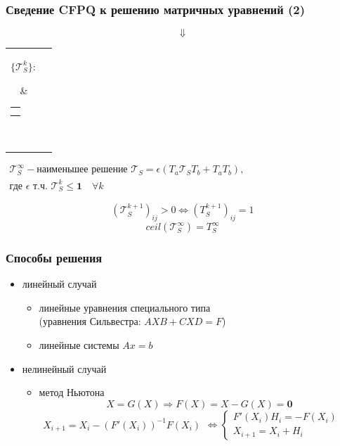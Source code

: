 \documentclass[xcolor=table]{beamer}
\begin{document}
\begin{frame}[fragile]
  \transwipe[direction=90]
  \frametitle{Сведение CFPQ к решению матричных уравнений (2)}
  
    $$\Downarrow$$
    \centering
    \begin{tabular}{cl}
    \parbox{0.07\linewidth}{
    $\{ \mathcal{T}_S^k \}:$
    }
    & \begin{tabular}{l}
    $\mathcal{T}_S^0 = \mathbf{0}$ \\
    $\mathcal{T}_S^{k+1} = \epsilon(T_a \mathcal{T}_S^k T_b + T_a T_b)$
    \end{tabular} \\
    \end{tabular}

    \vspace{20pt}
    \(
    \left.
    \begin{array}{c}
    \mathcal{T}_S^{\infty} - \texttt{наименьшее решение } \mathcal{T}_S = \epsilon(T_a \mathcal{T}_S T_b + T_a T_b), \\
    \texttt{где } \epsilon \texttt{ т.ч. } \mathcal{T}_{S}^{k} \leq \textbf{1} \quad \forall k
    \end{array}
    \right.
    \)
  
  \pause
  
  $$(\mathcal{T}_S^{k+1})_{ij} > 0 \iff (T_S^{k+1})_{ij} = 1$$
  $$ceil(\mathcal{T}_S^{\infty}) = T_S^{\infty}$$


\end{frame}

\begin{frame}[fragile]
  \transwipe[direction=90]
  \frametitle{Способы решения}
 
\begin{itemize}
    \item линейный случай
    \begin{itemize}
        \item линейные уравнения специального типа \\
        (уравнения Сильвестра: $AXB + CXD = F$)
        \item линейные системы $Ax=b$
    \end{itemize}
    \item нелинейный случай
    \begin{itemize}
        \item метод Ньютона \\
                $$X = G(X) \Rightarrow F(X) = X - G(X) = \mathbf{0}$$
                \(
                \left.
                \begin{array}{l}
                X_{i+1} = X_i - (F'(X_i))^{-1}F(X_i)
                \end{array}
                \right.
                \iff
                \left\{
                \begin{array}{l}
                F'(X_i)H_i = - F(X_i) \\
                X_{i+1} = X_i + H_i
                \end{array}
                \right.
                \)
    \end{itemize}
\end{itemize}
\end{frame}
\end{document}
